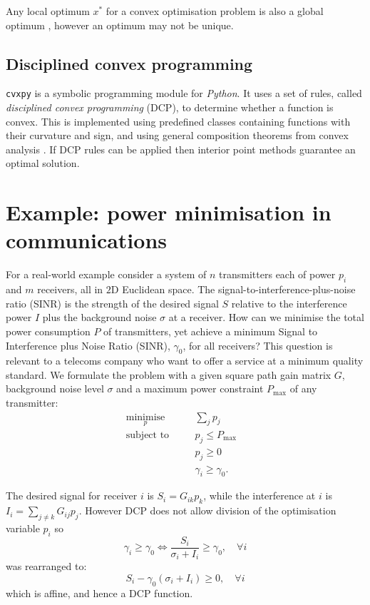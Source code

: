 \documentclass[twocolumn,secnumarabic,amssymb, nobibnotes, aps, prl,superscriptaddress]{revtex4-1}
\begin{document}
Any local optimum $x^*$ for a convex optimisation problem is also a global optimum \cite[pp.138-139]{cvxpybook}, however an optimum may not be unique.

\subsection{Disciplined convex programming}
\texttt{cvxpy} is a symbolic programming module for \textit{Python}\cite{cvxpy}. It uses a set of rules, called \textit{disciplined convex programming} (DCP), to determine whether a function is convex. This is implemented using predefined classes containing functions with their curvature and sign, and using general composition theorems from convex analysis \cite{dcp}. If DCP rules can be applied then interior point methods guarantee an optimal solution.

\section{Example: power minimisation in communications}
For a real-world example consider a system of $n$ transmitters each of power $p_i$ and $m$ receivers, all in $2$D Euclidean space\cite{shannon1949}. The signal-to-interference-plus-noise ratio (SINR) is the strength of the desired signal $S$ relative to the interference power $I$ plus the background noise $\sigma$ at a receiver. How can we minimise the total power consumption $P$ of transmitters, yet achieve a minimum Signal to Interference plus Noise Ratio (SINR), $\gamma_0$, for all receivers? This question is relevant to a telecoms company who want to offer a service at a minimum quality standard. We formulate the problem with a given square path gain matrix $G$, background noise level $\sigma$ and a maximum power constraint $P_{\text{max}}$ of any transmitter:
\begin{align*}
&\underset{p}{\text{minimise}} \quad &&\sum_j p_j\\
&\text{subject to} \quad &&p_j \leq P_{\max}\\
& \quad &&p_j \geq 0\\
& \quad &&\gamma_i \geq \gamma_0.&&
\end{align*}

The desired signal for receiver $i$ is $S_i = G_{ik}p_k$, while the interference at $i$ is $I_i = \sum_{j\neq k}G_{ij}p_j$. However DCP does not allow division of the optimisation variable $p_i$ so  
\begin{equation*}
  \gamma_i \geq \gamma_0\Longleftrightarrow  \frac{S_i}{\sigma_i + I_i}\geq \gamma_0, \quad \forall i
\end{equation*}
was rearranged to:
\begin{equation*}
S_i-\gamma_0(\sigma_i + I_i)\geq 0, \quad \forall i
\end{equation*} which is affine, and hence a DCP function.
\end{document}
